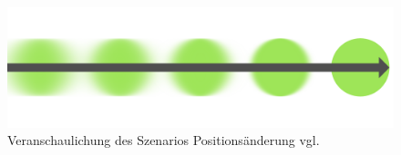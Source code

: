 \begin{description}
\begin{figure}[H]
    \centering
    \includegraphics[width=.8\textwidth]{files/lbgArten/changeOfDistance}
    \caption{Veranschaulichung des Szenarios Positionsänderung vgl. \cite[S. 2]{Lehmann:2012va}}
    \label{szenD}
\end{figure}

\end{description}

%
%
%
%
%
%
%
%
%
